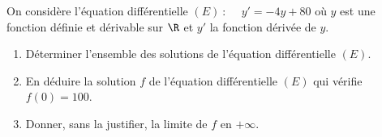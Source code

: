 \medskip

On considère l'équation différentielle $(E)~ :\quad  ~y' = -4y + 80$ où $y$ est une fonction définie et dérivable sur $\R$ et $y'$ la fonction dérivée de $y$. 
\begin{enumerate}
\item  Déterminer l'ensemble des solutions de l'équation différentielle $(E)$.
\item En déduire la solution $f$ de l'équation différentielle $(E)$ qui vérifie $f(0) = 100$.
\item Donner, sans la justifier, la limite de $f$ en $+\infty$.
\end{enumerate}
